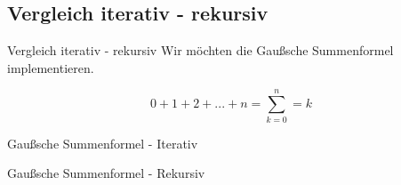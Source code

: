 \documentclass{../tuda-beamer}
\begin{document}
    \subsection{Vergleich iterativ - rekursiv}
    \begin{frame}{Vergleich iterativ - rekursiv}
        Wir möchten die Gaußsche Summenformel implementieren.

        \begin{equation}
            0 + 1 + 2 + ... + n = \sum_{k = 0}^n = k
        \end{equation}
    \end{frame}

    \begin{frame}{Gaußsche Summenformel - Iterativ}
        
    \end{frame}

    \begin{frame}{Gaußsche Summenformel - Rekursiv}
        
    \end{frame}
\end{document}
